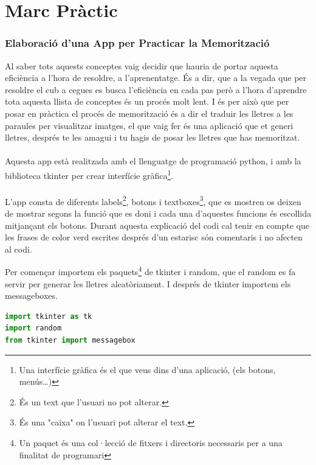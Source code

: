 \part*{Marc Pràctic}

\section{Elaboració d'una App per Practicar la Memorització}

Al saber tots aquests conceptes vaig decidir que hauria de portar aquesta eficiència a l'hora de resoldre, a l'aprenentatge. És a dir, que a la vegada que per resoldre el cub a cegues es busca l'eficiència en cada pas però a l'hora d'aprendre tota aquesta llista de conceptes és un procés molt lent.
I és per això que per posar en pràctica el procés de memorització és a dir el traduir les lletres a les paraules per visualitzar imatges, el que vaig fer és una aplicació que et generi lletres, després te les amagui i tu hagis de posar les lletres que has memoritzat.
\\\\Aquesta app està realitzada amb el llenguatge de programació python, i amb la biblioteca tkinter per crear interfície gràfica\footnote{Una interfície gràfica és el que veus dins d'una aplicació, (els botons, menús\dots)}.
\\\\L'app consta de diferents labels\footnote{És un text que l'usuari no pot alterar.}, botons i textboxes\footnote{És una "caixa" on l'usuari pot alterar el text.}, que es mostren os deixen de mostrar segons la funció que es doni i cada una d'aquestes funcions és escollida mitjançant els botons. Durant aquesta explicació del codi cal tenir en compte que les frases de color verd escrites després d'un estarisc són comentaris i no afecten al codi.

\vspace{0.5cm}

Per començar importem els paquets\footnote{Un paquet és una col·lecció de fitxers i directoris necessaris per a una finalitat de programari} de tkinter i random, que el random es fa servir per generar les lletres aleatòriament. I després de tkinter importem els messageboxes.

\begin{lstlisting}[language=Python, style=colorEX, caption=Importació de paquets]
import tkinter as tk
import random
from tkinter import messagebox
\end{lstlisting}

